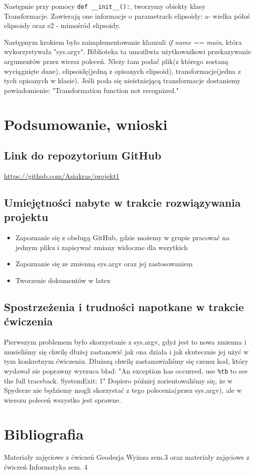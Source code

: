 \documentclass[10pt,a4paper]{article}
\begin{document}
Następnie przy pomocy \verb|def __init__():|, tworzymy  obiekty klasy Transformacje. Zawierają one informacje o parametrach elipsoidy: a- wielka półoś elipsoidy oraz e2 - mimośród elipsoidy. 
\vspace{0.5 cm}

Następnym krokiem było zaimplementowanie klauzuli \textit{if name == main}, która wykorzystywała "sys.argv". Biblioteka ta umożliwia użytkownikowi przekazywanie argumentów przez wiersz poleceń. Nleży tam podać plik(z którego zostaną wyciągnięte dane), elipsoidę(jedną z opisanych elipsoid), transformacje(jedna z tych opisanych w klasie). Jeśli poda się nieistniejącą transformacje dostaniemy powiadomienie: "Transformation function not recognized."
\section{Podsumowanie, wnioski}
\subsection{Link do repozytorium GitHub}
\href{https://github.com/Asiakras/projekt1}{https://github.com/Asiakras/projekt1}

\subsection{Umiejętności nabyte w trakcie rozwiązywania projektu}
\begin{itemize}
	\item Zapoznanie się z obsługą GitHub, gdzie możemy w grupie pracować na jednym pliku i zapisywać zmiany widoczne dla wszytkich
	\item Zapoznanie się ze zmienną sys.argv oraz jej zastosowaniem
	\item Tworzenie dokumentów w latex
\end{itemize}
\subsection{Spostrzeżenia i trudności napotkane w trakcie ćwiczenia}
Pierwszym problemem było skorzystanie z sys.argv, gdyż jest to nowa zmienna i musieliśmy się chwilę dłużej zastanowić jak ona działa i jak skutecznie jej użyć w tym konkretnym ćwiczeniu. Dłuższą chwilę zastanawialiśmy się czemu kod, który wydawał sie poprawny wyrzuca bład: "An exception has occurred, use
 \verb|%tb|  to see the full traceback.
\newline
SystemExit: 1"
\newline
Dopiero później zorientowaliśmy się, że w Spyderze nie będziemy mogli skorzystać z tego polecenia(przez sys.argv), ale w wierszu poleceń wszystko jest sprawne. 

\section{Bibliografia}
Materiały zajęciowe z ćwiczeń Geodezja Wyższa sem.3 oraz materiały zajęciowe z ćwiczeń Informatyka sem. 4
\end{document}

